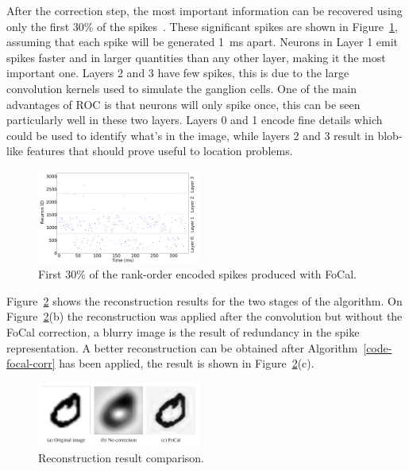 \documentclass{frontiersENG} %
\begin{document}
After the correction step, the most important information can be recovered using only the first 30\% of the spikes~\citep{sen2009evaluating}. These significant spikes are shown in Figure~\ref{fig-raster-plot-30pc}, assuming that each spike will be generated 1~ms apart. Neurons in Layer 1 emit spikes faster and in larger quantities than any other layer, making it the most important one. Layers 2 and 3 have few spikes, this is due to the large convolution kernels used to simulate the ganglion cells. One of the main advantages of ROC is that neurons will only spike once, this can be seen particularly well in these two layers. Layers 0 and 1 encode fine details which could be used to identify what's in the image, while layers 2 and 3 result in blob-like features that should prove useful to location problems.
\begin{figure}[hbt]
	\centering
	\includegraphics[width=0.48\textwidth]{fig3}
	\caption{First 30\% of the rank-order encoded spikes produced with FoCal.}
	\label{fig-raster-plot-30pc}
\end{figure}

Figure~\ref{fig-reconstruction-results} shows the reconstruction results for the two stages of the algorithm. On Figure~\ref{fig-reconstruction-results}(b) the reconstruction was applied after the convolution but without the FoCal correction, a blurry image is the result of redundancy in the spike representation. A better reconstruction can be obtained after Algorithm~\ref{code-focal-corr} has been applied, the result is shown in Figure~\ref{fig-reconstruction-results}(c).


\begin{figure}[hbt]
	\centering
	\includegraphics[width=0.48\textwidth]{fig4}
	\caption{Reconstruction result comparison.}
	\label{fig-reconstruction-results}
\end{figure}
\end{document}
